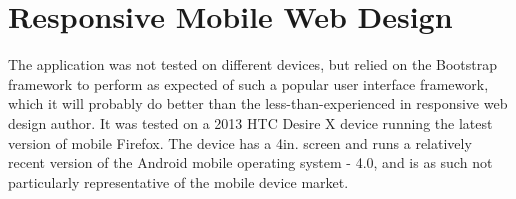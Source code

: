 

\section{Responsive Mobile Web Design}
\label{testing-mobile}
The application was not tested on different devices, but relied on the Bootstrap framework to perform as expected of such a popular user interface framework, which it will probably do better than the less-than-experienced in responsive web design author. It was tested on a 2013 HTC Desire X device running the latest version of mobile Firefox. The device has a 4in. screen and runs a relatively recent version of the Android mobile operating system - 4.0, and is as such not particularly representative of the mobile device market.